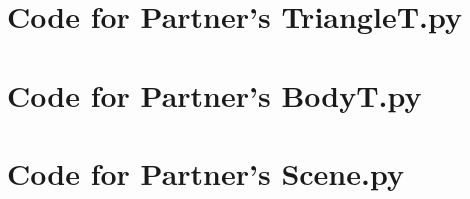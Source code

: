 \documentclass[12pt]{article}
\begin{document}
\newpage

\section{Code for Partner's TriangleT.py}

\noindent 

\newpage

\section{Code for Partner's BodyT.py}

\noindent 

\newpage

\section{Code for Partner's Scene.py}

\noindent 

\newpage
\end{document}
